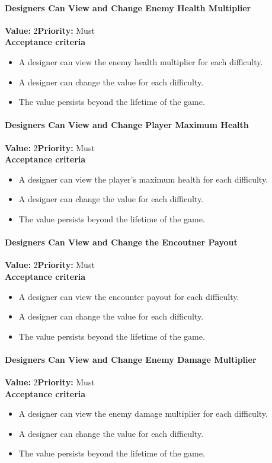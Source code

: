 \paragraph{Designers Can View and Change Enemy Health Multiplier}
\textbf{Value:} 2\quad \textbf{Priority:} Must\\
\textbf{Acceptance criteria}
\begin{itemize}
  \item A designer can view the enemy health multiplier for each difficulty.
  \item A designer can change the value for each difficulty.
  \item The value persists beyond the lifetime of the game.
\end{itemize}

\paragraph{Designers Can View and Change Player Maximum Health}
\textbf{Value:} 2\quad \textbf{Priority:} Must\\
\textbf{Acceptance criteria}
\begin{itemize}
  \item A designer can view the player's maximum health for each difficulty.
  \item A designer can change the value for each difficulty.
  \item The value persists beyond the lifetime of the game.
\end{itemize}

\paragraph{Designers Can View and Change the Encoutner Payout}
\textbf{Value:} 2\quad \textbf{Priority:} Must\\
\textbf{Acceptance criteria}
\begin{itemize}
  \item A designer can view the encounter payout for each difficulty.
  \item A designer can change the value for each difficulty.
  \item The value persists beyond the lifetime of the game.
\end{itemize}

\paragraph{Designers Can View and Change Enemy Damage Multiplier}
\textbf{Value:} 2\quad \textbf{Priority:} Must\\
\textbf{Acceptance criteria}
\begin{itemize}
  \item A designer can view the enemy damage multiplier for each difficulty.
  \item A designer can change the value for each difficulty.
  \item The value persists beyond the lifetime of the game.
\end{itemize}

